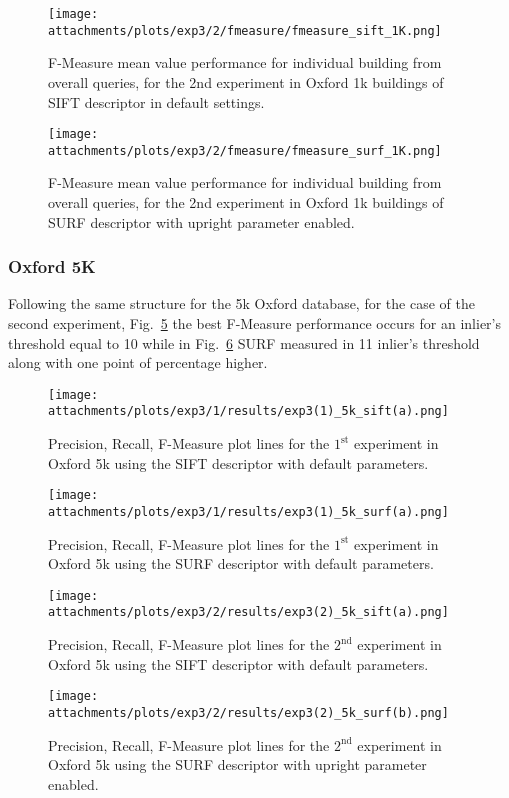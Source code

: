 		
		\begin{figure}[H]
		    \centering
		    \texttt{[image: attachments/plots/exp3/2/fmeasure/fmeasure\_sift\_1K.png]}
		    \caption{F-Measure mean value performance for individual building from overall queries, for the 2nd experiment in Oxford 1k buildings of SIFT descriptor in default settings.}
		    \label{fig:oxf_exp2_fmeasure_sift_1k}
		\end{figure}		
		
		\begin{figure}[H]
		    \centering
		    \texttt{[image: attachments/plots/exp3/2/fmeasure/fmeasure\_surf\_1K.png]}
		    \caption{F-Measure mean value performance for individual building from overall queries, for the 2nd experiment in Oxford 1k buildings of SURF descriptor with
		    upright parameter enabled.}
		    \label{fig:oxf_exp2_fmeasure_surf_1k}
		\end{figure}	
	
	\subsubsection{Oxford 5K}\label{det_ox_5k}
		Following the same structure for the 5k Oxford database, for the case of the second experiment,
		Fig.~\ref{fig:exp3_sift_a5k} the best F-Measure performance occurs for an inlier's threshold equal to 10 while in Fig.~\ref{fig:exp3_surf_b5k} SURF measured in 11 inlier's threshold along with one point of percentage higher.
		\newpage
		\begin{figure}[ht!]
		    \centering
		    \texttt{[image: attachments/plots/exp3/1/results/exp3(1)\_5k\_sift(a).png]}
		    \caption{Precision, Recall, F-Measure plot lines for the $1^\text{st}$ experiment in Oxford 5k using the SIFT descriptor with default parameters.}
		    \label{fig:oxf_exp1_sifta_1k}
		\end{figure}
		\begin{figure}[H]
		    \centering
		    \texttt{[image: attachments/plots/exp3/1/results/exp3(1)\_5k\_surf(a).png]}
		    \caption{Precision, Recall, F-Measure plot lines for the $1^\text{st}$ experiment in Oxford 5k using the SURF descriptor with default parameters.}
		    \label{fig:oxf_exp1_surfa_1k}
		\end{figure}

		\begin{figure}[H]
		    \centering
		    \texttt{[image: attachments/plots/exp3/2/results/exp3(2)\_5k\_sift(a).png]}
		    \caption{Precision, Recall, F-Measure plot lines for the $2^\text{nd}$ experiment in Oxford 5k using the SIFT descriptor with default parameters.}
		    \label{fig:exp3_sift_a5k}
		\end{figure}
		\begin{figure}[H]
		    \centering
		    \texttt{[image: attachments/plots/exp3/2/results/exp3(2)\_5k\_surf(b).png]}
		    \caption{Precision, Recall, F-Measure plot lines for the $2^\text{nd}$ experiment in Oxford 5k using the SURF descriptor with upright parameter enabled.}
		    \label{fig:exp3_surf_b5k}
		\end{figure}		
		
